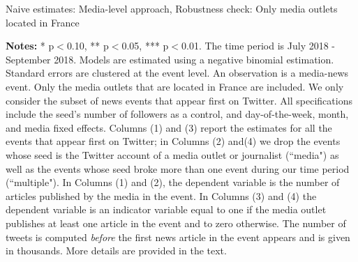 \begin{table}[h]
\caption{Naive estimates: Media-level approach, Robustness check: Only media outlets located in France}
\begin{center}
	
\end{center}
\begin{spacing}{0.5}
	{\fns \textbf{Notes:} * p$<$0.10, ** p$<$0.05, *** p$<$0.01. The time period is July 2018 - September 2018.  Models are estimated using a negative binomial estimation. Standard errors are clustered at the event level. An observation is a media-news event. Only the media outlets that are located in France are included. We only consider the subset of news events that appear first on Twitter. All specifications include the seed's number of followers as a control, and day-of-the-week, month, and media fixed effects. Columns (1) and (3) report the estimates for all the events that appear first on Twitter; in Columns (2) and(4) we drop the events whose seed is the Twitter account of a media outlet or journalist (``media") as well as the events whose seed broke more than one event during our time period (``multiple"). In Columns (1) and (2), the dependent variable is the number of articles published by the media in the event. In Columns (3) and (4) the dependent variable is an indicator variable equal to one if the media outlet publishes at least one article in the event and to zero otherwise. The number of tweets is computed \textit{before} the first news article in the event appears and is given in thousands. More details are provided in the text.} 
\end{spacing}
\label{Tab:number_articles_negbinomial_cevent_RFrench}
\end{table} 


